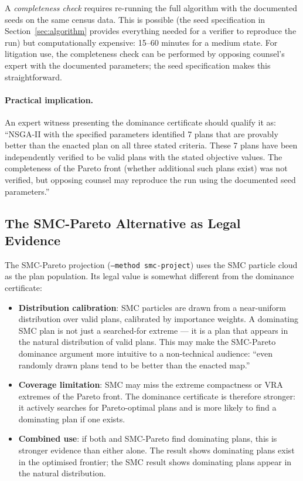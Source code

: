 A \emph{completeness check} requires re-running the full algorithm with the
documented seeds on the same census data.
This is possible (the seed specification in Section~\ref{sec:algorithm}
provides everything needed for a verifier to reproduce the run) but
computationally expensive: 15--60 minutes for a medium state.
For litigation use, the completeness check can be performed by opposing
counsel's expert with the documented parameters; the seed specification
makes this straightforward.

\paragraph{Practical implication.}
An expert witness presenting the dominance certificate should qualify it as:
``NSGA-II with the specified parameters identified 7 plans that are
provably better than the enacted plan on all three stated criteria.
These 7 plans have been independently verified to be valid plans with
the stated objective values.
The completeness of the Pareto front (whether additional such plans exist)
was not verified, but opposing counsel may reproduce the run using the
documented seed parameters.''

\subsection{The SMC-Pareto Alternative as Legal Evidence}

The SMC-Pareto projection (\texttt{--method smc-project}) uses the
SMC particle cloud as the plan population.
Its legal value is somewhat different from the \nsga{} dominance certificate:

\begin{itemize}
\item \textbf{Distribution calibration}: SMC particles are drawn from a
  near-uniform distribution over valid plans, calibrated by importance
  weights.
  A dominating SMC plan is not just a searched-for extreme --- it is a
  plan that appears in the natural distribution of valid plans.
  This may make the SMC-Pareto dominance argument more intuitive to
  a non-technical audience: ``even randomly drawn plans tend to be
  better than the enacted map.''

\item \textbf{Coverage limitation}: SMC may miss the extreme compactness
  or VRA extremes of the Pareto front.
  The \nsga{} dominance certificate is therefore stronger: it actively
  searches for Pareto-optimal plans and is more likely to find a dominating
  plan if one exists.

\item \textbf{Combined use}: if both \nsga{} and SMC-Pareto find dominating
  plans, this is stronger evidence than either alone.
  The \nsga{} result shows dominating plans exist in the optimised frontier;
  the SMC result shows dominating plans appear in the natural distribution.
\end{itemize}

